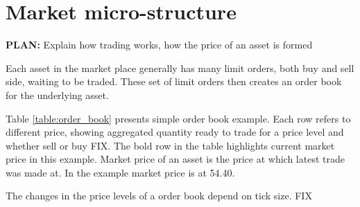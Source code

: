 \documentclass{tut-thesis}
\begin{document}

\section{Market micro-structure}
\textbf{PLAN:} Explain how trading works, how the price of an asset is formed

Each asset in the market place generally has many limit orders, both buy and sell side, waiting to be traded. These set of limit orders then creates an order book for the underlying asset. 


Table \ref{table:order_book} presents simple order book example. Each row refers to different price, showing aggregated quantity ready to trade for a price level and whether sell or buy FIX. The bold row in the table highlights current market price in this example. Market price of an asset is the price at which latest trade was made at. In the example market price is at 54.40.

The changes in the price levels of a order book depend on tick size. FIX
\end{document}
